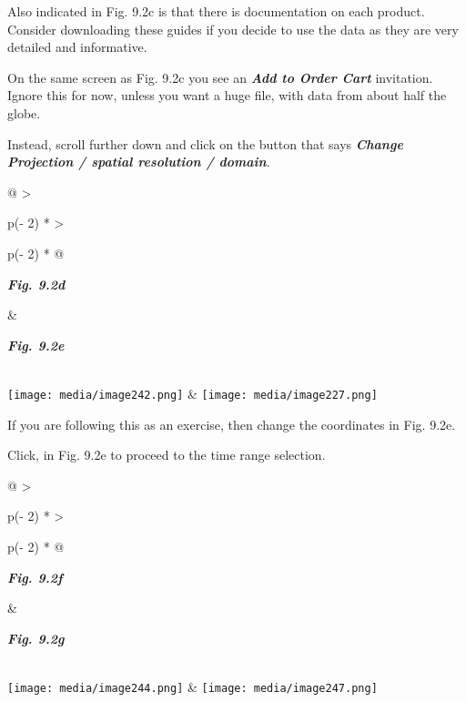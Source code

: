 \documentclass[
  letterpaper,
  DIV=11,
  numbers=noendperiod]{scrreprt}
\begin{document}
Also indicated in Fig. 9.2c is that there is documentation on each
product. Consider downloading these guides if you decide to use the data
as they are very detailed and informative.

On the same screen as Fig. 9.2c you see an \textbf{\emph{Add to Order
Cart}} invitation. Ignore this for now, unless you want a huge file,
with data from about half the globe.

Instead, scroll further down and click on the button that says
\textbf{\emph{Change Projection / spatial resolution / domain}}.

\begin{longtable}[]{@{}
  >{\raggedright\arraybackslash}p{(\columnwidth - 2\tabcolsep) * }
  >{\raggedright\arraybackslash}p{(\columnwidth - 2\tabcolsep) * }@{}}
\toprule\noalign{}
\begin{minipage}[b]{\linewidth}\raggedright
\textbf{\emph{Fig. 9.2d}}
\end{minipage} & \begin{minipage}[b]{\linewidth}\raggedright
\textbf{\emph{Fig. 9.2e}}
\end{minipage} \\
\midrule\noalign{}
\endhead
\bottomrule\noalign{}
\endlastfoot
\texttt{[image: media/image242.png]} &
\texttt{[image: media/image227.png]} \\
\end{longtable}

If you are following this as an exercise, then change the coordinates in
Fig. 9.2e.

Click, in Fig. 9.2e to proceed to the time range selection.

\begin{longtable}[]{@{}
  >{\raggedright\arraybackslash}p{(\columnwidth - 2\tabcolsep) * }
  >{\raggedright\arraybackslash}p{(\columnwidth - 2\tabcolsep) * }@{}}
\toprule\noalign{}
\begin{minipage}[b]{\linewidth}\raggedright
\textbf{\emph{Fig. 9.2f}}
\end{minipage} & \begin{minipage}[b]{\linewidth}\raggedright
\textbf{\emph{Fig. 9.2g}}
\end{minipage} \\
\midrule\noalign{}
\endhead
\bottomrule\noalign{}
\endlastfoot
\texttt{[image: media/image244.png]} &
\texttt{[image: media/image247.png]} \\
\end{longtable}
\end{document}
